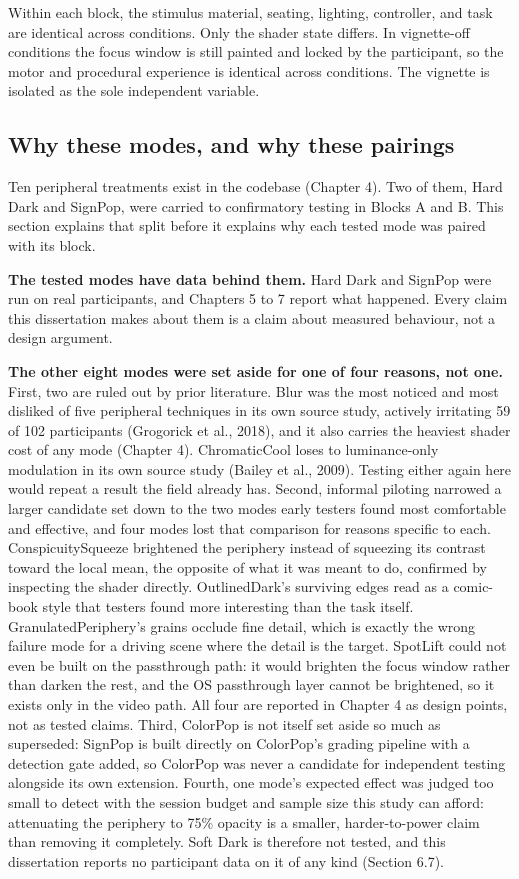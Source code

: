 Within each block, the stimulus material, seating, lighting, controller, and task are identical
across conditions. Only the shader state differs. In vignette-off conditions the focus window is
still painted and locked by the participant, so the motor and procedural experience is identical
across conditions. The vignette is isolated as the sole independent variable.

\subsection{Why these modes, and why these pairings}

Ten peripheral treatments exist in the codebase (Chapter 4). Two of them, Hard Dark and SignPop, were
carried to confirmatory testing in Blocks A and B. This section explains that split before it explains
why each tested mode was paired with its block.

\textbf{The tested modes have data behind them.} Hard Dark and SignPop were run on real participants,
and Chapters 5 to 7 report what happened. Every claim this dissertation makes about them is a claim
about measured behaviour, not a design argument.

\textbf{The other eight modes were set aside for one of four reasons, not one.} First, two are ruled
out by prior literature. Blur was the most noticed and most disliked of five peripheral techniques in
its own source study, actively irritating 59 of 102 participants (Grogorick et al., 2018), and it also
carries the heaviest shader cost of any mode (Chapter 4). ChromaticCool loses to luminance-only
modulation in its own source study (Bailey et al., 2009). Testing either again here would repeat a
result the field already has. Second, informal piloting narrowed a larger candidate set down to the
two modes early testers found most comfortable and effective, and four modes lost that comparison for
reasons specific to each. ConspicuitySqueeze brightened the periphery instead of squeezing its
contrast toward the local mean, the opposite of what it was meant to do, confirmed by inspecting the
shader directly. OutlinedDark's surviving edges read as a comic-book style that testers found more
interesting than the task itself. GranulatedPeriphery's grains occlude fine detail, which is exactly
the wrong failure mode for a driving scene where the detail is the target. SpotLift could not even be
built on the passthrough path: it would brighten the focus window rather than darken the rest, and the
OS passthrough layer cannot be brightened, so it exists only in the video path. All four are reported
in Chapter 4 as design points, not as tested claims. Third, ColorPop is
not itself set aside so much as superseded: SignPop is built directly
on ColorPop's grading pipeline with a detection gate added, so ColorPop was never a candidate for
independent testing alongside its own extension. Fourth, one mode's expected effect was judged too
small to detect with the session budget and sample size this study can afford: attenuating the
periphery to 75\% opacity is a smaller, harder-to-power claim than removing it completely. Soft Dark
is therefore not tested, and this dissertation reports no participant data on it of any kind
(Section 6.7).

